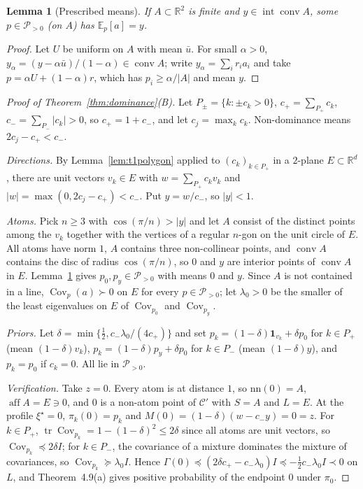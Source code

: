 \documentclass[11pt]{article}
\newtheorem{lemma}[theorem]{Lemma}
\theoremstyle{definition}
\theoremstyle{remark}
\newcommand{\R}{\mathbb R}
\newcommand{\E}{\mathbb E}
\newcommand{\Ppos}{\mathcal P_{>0}}
\newcommand{\nn}{\mathrm{nn}}
\DeclareMathOperator{\tr}{tr}
\DeclareMathOperator{\Cov}{Cov}
\DeclareMathOperator{\aff}{aff}
\DeclareMathOperator{\conv}{conv}
\begin{document}
\begin{lemma}[Prescribed means]\label{lem:t1means}
If $A\subset\R^2$ is finite and $y\in\operatorname{int}\conv A$, some $p\in\Ppos$ (on $A$) has
$\E_p[a]=y$.
\end{lemma}
\begin{proof}
Let $U$ be uniform on $A$ with mean $\bar u$. For small $\alpha>0$,
$y_\alpha=(y-\alpha\bar u)/(1-\alpha)\in\conv A$; write $y_\alpha=\sum_ir_ia_i$ and take
$p=\alpha U+(1-\alpha)r$, which has $p_i\ge\alpha/|A|$ and mean $y$.
\end{proof}

\begin{proof}[Proof of Theorem~\ref{thm:dominance}(B)]
Let $P_\pm=\{k:\pm c_k>0\}$, $c_+=\sum_{P_+}c_k$, $c_-=\sum_{P_-}|c_k|>0$, so $c_+=1+c_-$, and let
$c_j=\max_kc_k$. Non-dominance means $2c_j-c_+<c_-$.

\emph{Directions.} By Lemma~\ref{lem:t1polygon} applied to $(c_k)_{k\in P_+}$ in a $2$-plane
$E\subset\R^d$, there are unit vectors $v_k\in E$ with $w=\sum_{P_+}c_kv_k$ and
$|w|=\max(0,2c_j-c_+)<c_-$. Put $y=w/c_-$, so $|y|<1$.

\emph{Atoms.} Pick $n\ge3$ with $\cos(\pi/n)>|y|$ and let $A$ consist of the distinct points among
the $v_k$ together with the vertices of a regular $n$-gon on the unit circle of $E$. All atoms have
norm $1$, $A$ contains three non-collinear points, and $\conv A$ contains the disc of radius
$\cos(\pi/n)$, so $0$ and $y$ are interior points of $\conv A$ in $E$. Lemma~\ref{lem:t1means} gives
$p_0,p_y\in\Ppos$ with means $0$ and $y$. Since $A$ is not contained in a line, $\Cov_p(a)\succ0$ on
$E$ for every $p\in\Ppos$; let $\lambda_0>0$ be the smaller of the least eigenvalues on $E$ of
$\Cov_{p_0}$ and $\Cov_{p_y}$.

\emph{Priors.} Let $\delta=\min\{\frac12,c_-\lambda_0/(4c_+)\}$ and set
$p_k=(1-\delta)\mathbf 1_{v_k}+\delta p_0$ for $k\in P_+$ (mean $(1-\delta)v_k$),
$p_k=(1-\delta)p_y+\delta p_0$ for $k\in P_-$ (mean $(1-\delta)y$), and $p_k=p_0$ if $c_k=0$. All lie
in $\Ppos$.

\emph{Verification.} Take $z=0$. Every atom is at distance $1$, so $\nn(0)=A$, $\aff A=E\ni0$, and
$0$ is a non-atom point of $\mathcal C'$ with $S=A$ and $L=E$. At the profile $\xi^\star=0$,
$\pi_k(0)=p_k$ and $M(0)=(1-\delta)(w-c_-y)=0=z$. For $k\in P_+$,
$\tr\Cov_{p_k}=1-(1-\delta)^2\le2\delta$ since all atoms are unit vectors, so
$\Cov_{p_k}\preceq2\delta I$; for $k\in P_-$, the covariance of a mixture dominates the mixture of
covariances, so $\Cov_{p_k}\succeq\lambda_0I$. Hence
$\Gamma(0)\preceq(2\delta c_+-c_-\lambda_0)I\preceq-\frac12c_-\lambda_0I\prec0$ on $L$, and
Theorem~4.9(a) gives positive probability of the endpoint $0$ under $\pi_0$.
\end{proof}
\end{document}
